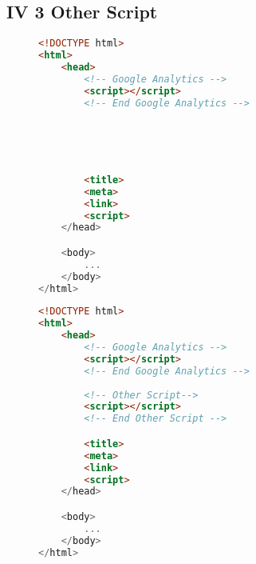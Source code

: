\subsection{IV 3 Other Script}

\begin{sidewaysfigure}
\begin{multicols}{2}
\begin{center}
\begin{lstlisting}[caption={Other Script 1}, language=html, numbers=none]
<!DOCTYPE html>
<html>
    <head>
        <!-- Google Analytics -->
        <script></script>
        <!-- End Google Analytics -->
        




        <title>
        <meta>
        <link>
        <script>
    </head>

    <body>
        ...
    </body>
</html>
\end{lstlisting}
\end{center}

\columnbreak

\begin{center}
\begin{lstlisting}[caption={Other Script 2}, language=html, numbers=none]
<!DOCTYPE html>
<html>
    <head>
        <!-- Google Analytics -->
        <script></script>
        <!-- End Google Analytics -->
        
        <!-- Other Script-->
        <script></script>
        <!-- End Other Script -->

        <title>
        <meta>
        <link>
        <script>
    </head>

    <body>
        ...
    </body>
</html>
\end{lstlisting}
\end{center}
\end{multicols}
\end{sidewaysfigure}













